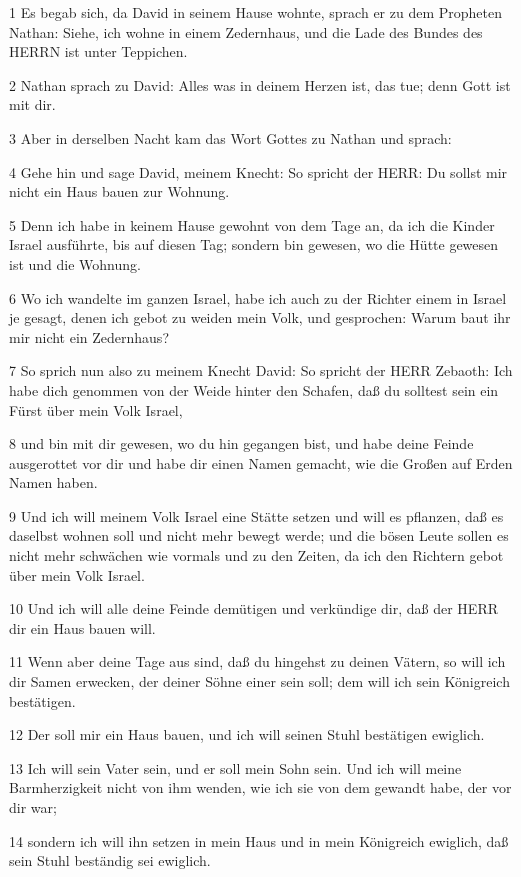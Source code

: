 \par 1 Es begab sich, da David in seinem Hause wohnte, sprach er zu dem Propheten Nathan: Siehe, ich wohne in einem Zedernhaus, und die Lade des Bundes des HERRN ist unter Teppichen.
\par 2 Nathan sprach zu David: Alles was in deinem Herzen ist, das tue; denn Gott ist mit dir.
\par 3 Aber in derselben Nacht kam das Wort Gottes zu Nathan und sprach:
\par 4 Gehe hin und sage David, meinem Knecht: So spricht der HERR: Du sollst mir nicht ein Haus bauen zur Wohnung.
\par 5 Denn ich habe in keinem Hause gewohnt von dem Tage an, da ich die Kinder Israel ausführte, bis auf diesen Tag; sondern bin gewesen, wo die Hütte gewesen ist und die Wohnung.
\par 6 Wo ich wandelte im ganzen Israel, habe ich auch zu der Richter einem in Israel je gesagt, denen ich gebot zu weiden mein Volk, und gesprochen: Warum baut ihr mir nicht ein Zedernhaus?
\par 7 So sprich nun also zu meinem Knecht David: So spricht der HERR Zebaoth: Ich habe dich genommen von der Weide hinter den Schafen, daß du solltest sein ein Fürst über mein Volk Israel,
\par 8 und bin mit dir gewesen, wo du hin gegangen bist, und habe deine Feinde ausgerottet vor dir und habe dir einen Namen gemacht, wie die Großen auf Erden Namen haben.
\par 9 Und ich will meinem Volk Israel eine Stätte setzen und will es pflanzen, daß es daselbst wohnen soll und nicht mehr bewegt werde; und die bösen Leute sollen es nicht mehr schwächen wie vormals und zu den Zeiten, da ich den Richtern gebot über mein Volk Israel.
\par 10 Und ich will alle deine Feinde demütigen und verkündige dir, daß der HERR dir ein Haus bauen will.
\par 11 Wenn aber deine Tage aus sind, daß du hingehst zu deinen Vätern, so will ich dir Samen erwecken, der deiner Söhne einer sein soll; dem will ich sein Königreich bestätigen.
\par 12 Der soll mir ein Haus bauen, und ich will seinen Stuhl bestätigen ewiglich.
\par 13 Ich will sein Vater sein, und er soll mein Sohn sein. Und ich will meine Barmherzigkeit nicht von ihm wenden, wie ich sie von dem gewandt habe, der vor dir war;
\par 14 sondern ich will ihn setzen in mein Haus und in mein Königreich ewiglich, daß sein Stuhl beständig sei ewiglich.
